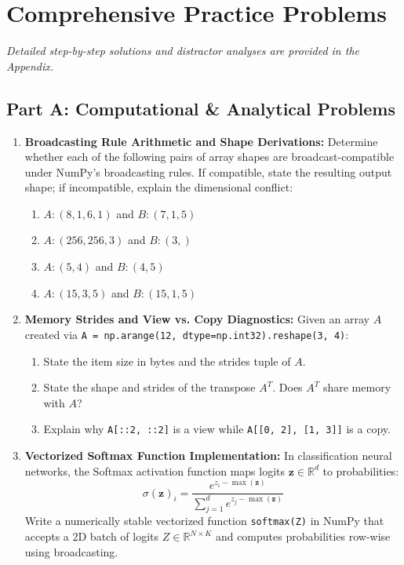 \newpage
\section{Comprehensive Practice Problems}
\textit{Detailed step-by-step solutions and distractor analyses are provided in the Appendix.}

\subsection*{Part A: Computational \& Analytical Problems}

\begin{enumerate}
    \item \textbf{Broadcasting Rule Arithmetic and Shape Derivations:}
    Determine whether each of the following pairs of array shapes are broadcast-compatible under NumPy's broadcasting rules. If compatible, state the resulting output shape; if incompatible, explain the dimensional conflict:
    \begin{enumerate}
        \item $A: (8, 1, 6, 1)$ and $B: (7, 1, 5)$
        \item $A: (256, 256, 3)$ and $B: (3,)$
        \item $A: (5, 4)$ and $B: (4, 5)$
        \item $A: (15, 3, 5)$ and $B: (15, 1, 5)$
    \end{enumerate}

    \item \textbf{Memory Strides and View vs. Copy Diagnostics:}
    Given an array $A$ created via \texttt{A = np.arange(12, dtype=np.int32).reshape(3, 4)}:
    \begin{enumerate}
        \item State the item size in bytes and the strides tuple of $A$.
        \item State the shape and strides of the transpose $A^T$. Does $A^T$ share memory with $A$?
        \item Explain why \texttt{A[::2, ::2]} is a view while \texttt{A[[0, 2], [1, 3]]} is a copy.
    \end{enumerate}

    \item \textbf{Vectorized Softmax Function Implementation:}
    In classification neural networks, the Softmax activation function maps logits $\mathbf{z} \in \mathbb{R}^d$ to probabilities:
    \begin{equation}
    \sigma(\mathbf{z})_i = \frac{e^{z_i - \max(\mathbf{z})}}{\sum_{j=1}^d e^{z_j - \max(\mathbf{z})}}
    \end{equation}
    Write a numerically stable vectorized function \texttt{softmax(Z)} in NumPy that accepts a 2D batch of logits $Z \in \mathbb{R}^{N \times K}$ and computes probabilities row-wise using broadcasting.


\end{enumerate}
